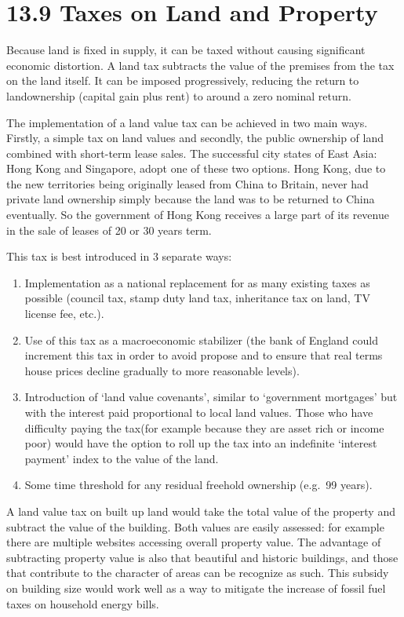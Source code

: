 \documentclass[]{tufte-handout}
\providecommand{\tightlist}{%
  \setlength{\itemsep}{0pt}\setlength{\parskip}{0pt}}
\begin{document}
\hypertarget{taxes-on-land-and-property}{%
\section{13.9 Taxes on Land and
Property}\label{taxes-on-land-and-property}}

Because land is fixed in supply, it can be taxed without causing
significant economic distortion. A land tax subtracts the value of the
premises from the tax on the land itself. It can be imposed
progressively, reducing the return to landownership (capital gain plus
rent) to around a zero nominal return.

The implementation of a land value tax can be achieved in two main ways.
Firstly, a simple tax on land values and secondly, the public ownership
of land combined with short-term lease sales. The successful city states
of East Asia: Hong Kong and Singapore, adopt one of these two options.
Hong Kong, due to the new territories being originally leased from China
to Britain, never had private land ownership simply because the land was
to be returned to China eventually. So the government of Hong Kong
receives a large part of its revenue in the sale of leases of 20 or 30
years term.

This tax is best introduced in 3 separate ways:

\begin{enumerate}
\def\labelenumi{\arabic{enumi}.}
\tightlist
\item
  Implementation as a national replacement for as many existing taxes as
  possible (council tax, stamp duty land tax, inheritance tax on land,
  TV license fee, etc.).
\item
  Use of this tax as a macroeconomic stabilizer (the bank of England
  could increment this tax in order to avoid propose and to ensure that
  real terms house prices decline gradually to more reasonable levels).
\item
  Introduction of `land value covenants', similar to `government
  mortgages' but with the interest paid proportional to local land
  values. Those who have difficulty paying the tax(for example because
  they are asset rich or income poor) would have the option to roll up
  the tax into an indefinite `interest payment' index to the value of
  the land.
\item
  Some time threshold for any residual freehold ownership (e.g.~99
  years).
\end{enumerate}

A land value tax on built up land would take the total value of the
property and subtract the value of the building. Both values are easily
assessed: for example there are multiple websites accessing overall
property value. The advantage of subtracting property value is also that
beautiful and historic buildings, and those that contribute to the
character of areas can be recognize as such. This subsidy on building
size would work well as a way to mitigate the increase of fossil fuel
taxes on household energy bills.
\end{document}

